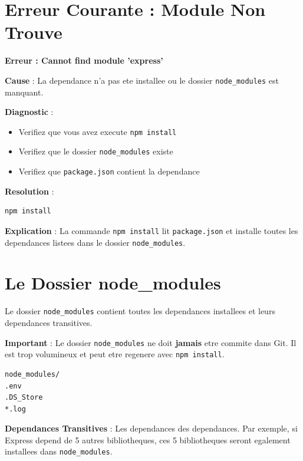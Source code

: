 \documentclass[a4paper,12pt]{book}
\begin{document}
\section{Erreur Courante : Module Non Trouve}

\begin{errorbox}
    \textbf{Erreur : Cannot find module 'express'}

    \textbf{Cause} : La dependance n'a pas ete installee ou le dossier \texttt{node\_modules} est manquant.

    \textbf{Diagnostic} :
    \begin{itemize}
        \item Verifiez que vous avez execute \texttt{npm install}
        \item Verifiez que le dossier \texttt{node\_modules} existe
        \item Verifiez que \texttt{package.json} contient la dependance
    \end{itemize}

    \textbf{Resolution} :
    \begin{lstlisting}[style=bash]
npm install
    \end{lstlisting}

    \textbf{Explication} : La commande \texttt{npm install} lit \texttt{package.json} et installe toutes les dependances listees dans le dossier \texttt{node\_modules}.
\end{errorbox}

\section{Le Dossier node\_modules}

Le dossier \texttt{node\_modules} contient toutes les dependances installees et leurs dependances transitives.

\begin{warningbox}
    \textbf{Important} : Le dossier \texttt{node\_modules} ne doit \textbf{jamais} etre commite dans Git. Il est trop volumineux et peut etre regenere avec \texttt{npm install}.
\end{warningbox}

\begin{lstlisting}[style=bash, caption=Contenu de .gitignore]
node_modules/
.env
.DS_Store
*.log
\end{lstlisting}

\begin{definitionbox}
    \textbf{Dependances Transitives} : Les dependances des dependances. Par exemple, si Express depend de 5 autres bibliotheques, ces 5 bibliotheques seront egalement installees dans \texttt{node\_modules}.
\end{definitionbox}
\end{document}
